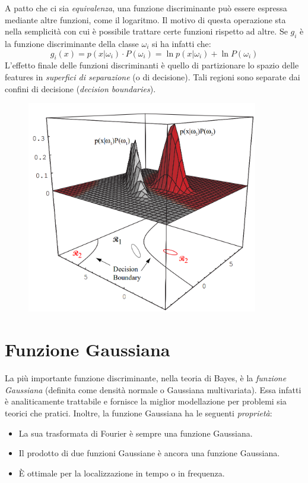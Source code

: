 \documentclass[a4paper,oneside,titlepage]{book}
\begin{document}
A patto che ci sia \textit{equivalenza}, una funzione discriminante può essere espressa mediante altre funzioni, come il logaritmo. Il motivo di questa operazione sta nella semplicità con cui è possibile trattare certe funzioni rispetto ad altre. Se $g_i$ è la funzione discriminante della classe $\omega_i$ si ha infatti che:
\[ g_i(x) = p(x|\omega_i) \cdot P(\omega_i) = \ln p(x|\omega_i) + \ln P(\omega_i) \]
L'effetto finale delle funzioni discriminanti è quello di partizionare lo spazio delle features in \textit{superfici di separazione} (o di decisione). Tali regioni sono separate dai confini di decisione (\textit{decision boundaries}).
\newpage
\begin{figure}[htp]
	\centering
	\includegraphics[width=0.9\textwidth]{regioni.png}
\end{figure}

\section{Funzione Gaussiana}
La più importante funzione discriminante, nella teoria di Bayes, è la \textit{funzione Gaussiana} (definita come densità normale o Gaussiana multivariata). Essa infatti è analiticamente trattabile e fornisce la miglior modellazione per problemi sia teorici che pratici. Inoltre, la funzione Gaussiana ha le seguenti \textit{proprietà}:
\begin{itemize}
    \item La sua trasformata di Fourier è sempre una funzione Gaussiana.
    \item Il prodotto di due funzioni Gaussiane è ancora una funzione Gaussiana.
    \item \`{E} ottimale per la localizzazione in tempo o in frequenza.
\end{itemize}
\end{document}
